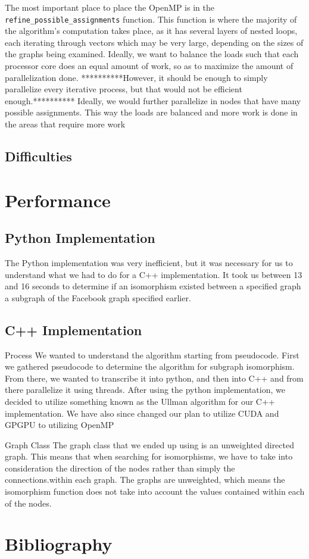 \documentclass{article}
\begin{document}
  The most important place to place the OpenMP is in the \texttt{refine\_possible\_assignments} function. This function is where the majority of the algorithm's computation takes place, as it has several layers of nested loops, each iterating through vectors which may be very large, depending on the sizes of the graphs being examined. Ideally, we want to balance the loads such that each processor core does an equal amount of work, so as to maximize the amount of parallelization done. **********However, it should be enough to simply parallelize every iterative process, but that would not be efficient enough.********** Ideally, we would further parallelize in nodes that have many possible assignments. This way the loads are balanced and more work is done in the areas that require more work

  \subsection{Difficulties}

\section{Performance}

  \subsection{Python Implementation}
  The Python implementation was very inefficient, but it was necessary for us to understand what we had to do for a C++ implementation. It took us between 13 and 16 seconds to determine if an isomorphism existed between a specified graph a subgraph of the Facebook graph specified earlier.

  \subsection{C++ Implementation}
Process
We wanted to understand the algorithm starting from pseudocode. First we gathered pseudocode to determine the algorithm for subgraph isomorphism. From there, we wanted to transcribe it into python, and then into C++ and from there parallelize it using threads. After using the python implementation, we decided to utilize something known as the Ullman algorithm for our C++ implementation. We have also since changed our plan to utilize CUDA and GPGPU to utilizing OpenMP

Graph Class
The graph class that we ended up using is an unweighted directed graph. This means that when searching for isomorphisms, we have to take into consideration the direction of the nodes rather than simply the connections.within each graph. The graphs are unweighted, which means the isomorphism function does not take into account the values contained within each of the nodes.

  \section{Bibliography}
\end{document}

